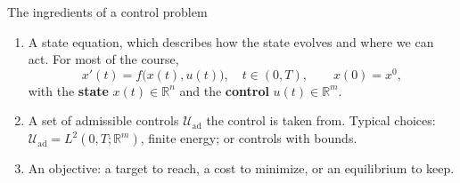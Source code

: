 \documentclass[10pt]{beamer}
\newcommand{\R}{\mathbb{R}}
\newcommand{\Uad}{\mathcal{U}_{\mathrm{ad}}}
\begin{document}



\begin{frame}{The ingredients of a control problem}
\begin{enumerate}
\item \alert{A state equation}, which describes how the state evolves and where we can act. For most of the course,
\[
x'(t)=f\big(x(t),u(t)\big),\quad t\in(0,T),\qquad x(0)=x^0,
\]
with the \textbf{state} $x(t)\in\R^n$ and the \textbf{control} $u(t)\in\R^m$.
\item \alert{A set of admissible controls} $\Uad$ the control is taken from. Typical choices: $\Uad=L^2(0,T;\R^m)$, finite energy; or controls with bounds.
\item \alert{An objective}: a target to reach, a cost to minimize, or an equilibrium to keep. 
\end{enumerate}

\end{frame}
\end{document}
